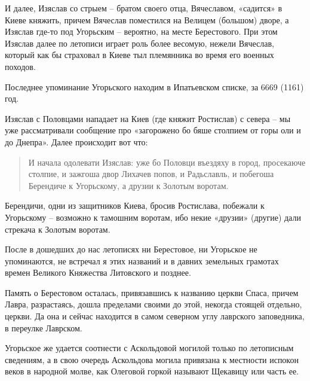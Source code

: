 \documentclass[a5paper,11pt,openany]{article}
\begin{document}
И далее, Изяслав со стрыем – братом своего отца, Вячеславом, «садится» в Киеве княжить, причем Вячеслав поместился на Велицем (большом) дворе, а Изяслав где-то под Угорьским – вероятно, на месте Берестового. При этом Изяслав далее по летописи играет роль более весомую, нежели Вячеслав, который как бы страховал в Киеве тыл племянника во время его военных походов.

Последнее упоминание Угорьского находим в Ипатьевском списке, за 6669 (1161) год. 

Изяслав с Половцами нападает на Киев (где княжит Ростислав) с севера – мы уже рассматривали сообщение про «загорожено бо бяше столпием от горы оли и до Днепра». Далее происходит вот что:

\begin{quotation}
\noindent И начала одолевати Изяслав: уже бо Половци въездяху в город, просекаюче столпие, и зажгоша двор Лихачев попов, и Радьславль, и побегоша Берендиче к Угорьскому, а друзии к Золотым воротам.
\end{quotation}

Берендичи, одни из защитников Киева, бросив Ростислава, побежали к Угорьскому – возможно к тамошним воротам, ибо некие «друзии» (другие) дали стрекача к Золотым воротам.

После в дошедших до нас летописях ни Берестовое, ни Угорьское не упоминаются, не встречал я этих названий и в давних земельных грамотах времен Великого Княжества Литовского и позднее.

Память о Берестовом осталась, привязавшись к названию церкви Спаса, причем Лавра, разрастаясь, дошла пределами своими до этой, некогда стоящей отдельно, церкви. Да она и сейчас находится в самом северном углу лаврского заповедника, в переулке Лаврском.

Угорьское же удается соотнести с Аскольдовой могилой только по летописным сведениям, а в свою очередь Аскольдова могила привязана к местности испокон веков в народной молве, как Олеговой горкой называют Щекавицу или часть ее. 




\newpage




%

\begin{thebibliography}{999}

\end{thebibliography}
\end{document}

